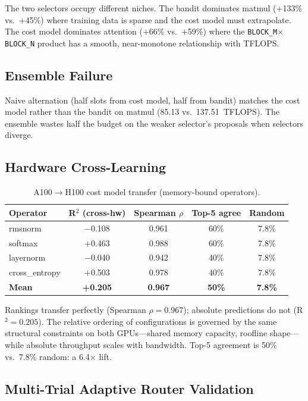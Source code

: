 \documentclass[11pt]{article}
\begin{document}
The two selectors occupy different niches. The bandit dominates matmul (+133\%
vs.\ +45\%) where training data is sparse and the cost model must extrapolate.
The cost model dominates attention (+66\% vs.\ +59\%) where the
\texttt{BLOCK\_M}$\times$\texttt{BLOCK\_N} product has a smooth, near-monotone
relationship with TFLOPS.


\subsection{Ensemble Failure}
\label{sec:ensemble-failure}

Naive alternation (half slots from cost model, half from bandit) matches the cost
model rather than the bandit on matmul (85.13 vs.\ 137.51~TFLOPS). The ensemble
wastes half the budget on the weaker selector's proposals when selectors
diverge.


\subsection{Hardware Cross-Learning}
\label{sec:hw-cross-learning}

\begin{table}[t]
\centering
\caption{A100$\to$H100 cost model transfer (memory-bound operators).}
\label{tab:hw-transfer}
\small
\begin{tabular}{@{}lcccc@{}}
\toprule
Operator & R$^2$ (cross-hw) & Spearman $\rho$ & Top-5 agree & Random \\
\midrule
rmsnorm & $-$0.108 & 0.961 & 60\% & 7.8\% \\
softmax & +0.463 & 0.988 & 60\% & 7.8\% \\
layernorm & $-$0.040 & 0.942 & 40\% & 7.8\% \\
cross\_entropy & +0.503 & 0.978 & 40\% & 7.8\% \\
\midrule
\textbf{Mean} & \textbf{+0.205} & \textbf{0.967} & \textbf{50\%} & \textbf{7.8\%} \\
\bottomrule
\end{tabular}
\end{table}

Rankings transfer perfectly (Spearman $\rho = 0.967$); absolute predictions do
not (R$^2 = 0.205$). The relative ordering of configurations is governed by the
same structural constraints on both GPUs---shared memory capacity, roofline
shape---while absolute throughput scales with bandwidth. Top-5 agreement is
50\% vs.\ 7.8\% random: a 6.4$\times$ lift.


\subsection{Multi-Trial Adaptive Router Validation}
\label{sec:adaptive-router}
\end{document}
